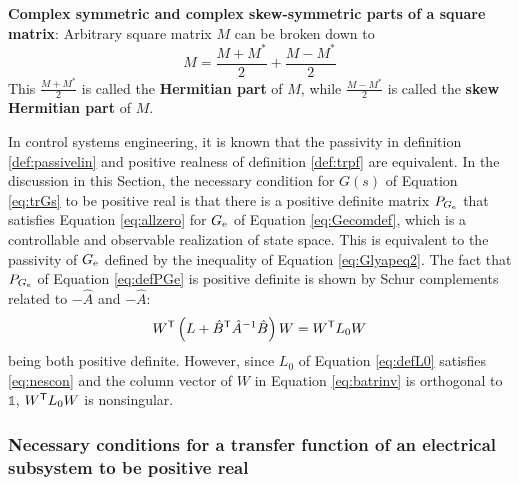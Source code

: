 \documentclass[tombow,dvipdfmx]{corona-a5-1.1}
\begin{document}
\begin{COLUMN}
\noindent \textbf{Complex symmetric and complex skew-symmetric parts of a square matrix}:
Arbitrary square matrix $M$ can be broken down to
\[
M=\frac{M+M^*}{2}+\frac{M-M^*}{2}
\]
This $\tfrac{M+M^*}{2}$ is called the \textbf{Hermitian part} of $M$, while $\tfrac{M-M^*}{2}$ is called the \textbf{skew Hermitian part} of $M$.
\end{COLUMN}

In control systems engineering, it is known that the passivity in definition \ref{def:passivelin} and positive realness of definition \ref{def:trpf} are equivalent.
In the discussion in this Section, the necessary condition for $G(s)$ of Equation \ref{eq:trGs} to be positive real is that there is a positive definite matrix $P_{G_{\rm e}}$ that satisfies Equation \ref{eq:allzero} for $G_{\rm e}$ of Equation \ref{eq:Gecomdef}, which is a controllable and observable realization of state space.
This is equivalent to the passivity of $G_{\rm e}$ defined by the inequality of Equation \ref{eq:Glyapeq2}.
The fact that $P_{G_{\rm e}}$ of Equation \ref{eq:defPGe} is positive definite is shown by Schur complements related to $-\hat{A}$ and $-\hat{A}$:
\[
W^{\sf T} \left(L+\hat{B}^{\sf T} \hat{A}^{-1} \hat{B} \right) W
=  W^{\sf T} L_0 W
\]
being both positive definite.
However, since $L_0$ of Equation \ref{eq:defL0} satisfies \ref{eq:nescon} and the column vector of $W$ in Equation \ref{eq:batrinv} is orthogonal to $\mathds{1}$, $W^{\sf T} L_0 W$ is nonsingular.




\smallskip
\subsubsection{Necessary conditions for a transfer function of an electrical subsystem to be positive real}
\end{document}
